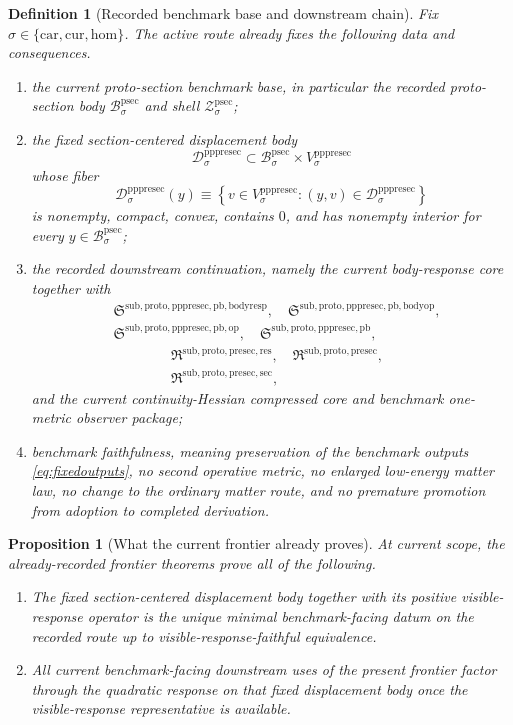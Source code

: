 \documentclass[11pt]{article}
\newcommand{\Car}{\mathrm{car}}
\newcommand{\Cur}{\mathrm{cur}}
\newcommand{\Hom}{\mathrm{hom}}
\newcommand{\ProtoSectionBody}[1]{\mathcal B_{#1}^{\mathrm{psec}}}
\newcommand{\ProtoSectionShell}[1]{\mathcal Z_{#1}^{\mathrm{psec}}}
\newcommand{\PrePreProtoSectionVertical}[1]{V_{#1}^{\mathrm{pppresec}}}
\newcommand{\PrePreProtoSectionResidualBody}[1]{\mathcal D_{#1}^{\mathrm{pppresec}}}
\newcommand{\PullbackBodyResponseCore}{\mathfrak S^{\mathrm{sub,proto,pppresec,pb,bodyresp}}}
\newcommand{\PullbackBodyOperatorCore}{\mathfrak S^{\mathrm{sub,proto,pppresec,pb,bodyop}}}
\newcommand{\PullbackOperatorCore}{\mathfrak S^{\mathrm{sub,proto,pppresec,pb,op}}}
\newcommand{\PrePreProtoSectionPullbackCore}{\mathfrak S^{\mathrm{sub,proto,pppresec,pb}}}
\newcommand{\PreProtoSectionResidualPackage}{\mathfrak R^{\mathrm{sub,proto,presec,res}}}
\newcommand{\PreProtoSectionPackage}{\mathfrak R^{\mathrm{sub,proto,presec}}}
\newcommand{\PreProtoSectionMinSectionCore}{\mathfrak R^{\mathrm{sub,proto,presec,sec}}}
\newtheorem{definition}{Definition}
\newtheorem{proposition}{Proposition}
\begin{document}
\begin{definition}[Recorded benchmark base and downstream chain]
\label{def:route}
Fix \(\sigma\in\{\Car,\Cur,\Hom\}\). The active route already fixes the following data and consequences.
\begin{enumerate}
    \item the current proto-section benchmark base, in particular the recorded proto-section body \(\ProtoSectionBody{\sigma}\) and shell \(\ProtoSectionShell{\sigma}\);
    \item the fixed section-centered displacement body
    \[
    \PrePreProtoSectionResidualBody{\sigma}
    \subset
    \ProtoSectionBody{\sigma}\times\PrePreProtoSectionVertical{\sigma}
    \]
    whose fiber
    \[
    \PrePreProtoSectionResidualBody{\sigma}(y)
    \equiv
    \left\{
    v\in\PrePreProtoSectionVertical{\sigma}:(y,v)\in\PrePreProtoSectionResidualBody{\sigma}
    \right\}
    \]
    is nonempty, compact, convex, contains \(0\), and has nonempty interior for every \(y\in\ProtoSectionBody{\sigma}\);
    \item the recorded downstream continuation, namely the current body-response core together with
    \[
    \begin{aligned}
    &\PullbackBodyResponseCore,\quad
    \PullbackBodyOperatorCore,\\
    &\PullbackOperatorCore,\quad
    \PrePreProtoSectionPullbackCore,
    \end{aligned}
    \]
    \[
    \begin{aligned}
    &\PreProtoSectionResidualPackage,\quad
    \PreProtoSectionPackage,\\
    &\PreProtoSectionMinSectionCore,
    \end{aligned}
    \]
    and the current continuity-Hessian compressed core and benchmark one-metric observer package;
    \item benchmark faithfulness, meaning preservation of the benchmark outputs \eqref{eq:fixedoutputs}, no second operative metric, no enlarged low-energy matter law, no change to the ordinary matter route, and no premature promotion from adoption to completed derivation.
\end{enumerate}
\end{definition}

\begin{proposition}[What the current frontier already proves]
\label{prop:frontier}
At current scope, the already-recorded frontier theorems prove all of the following.
\begin{enumerate}
    \item The fixed section-centered displacement body together with its positive visible-response operator is the unique minimal benchmark-facing datum on the recorded route up to visible-response-faithful equivalence.
    \item All current benchmark-facing downstream uses of the present frontier factor through the quadratic response on that fixed displacement body once the visible-response representative is available.
\end{enumerate}
\end{proposition}
\end{document}

